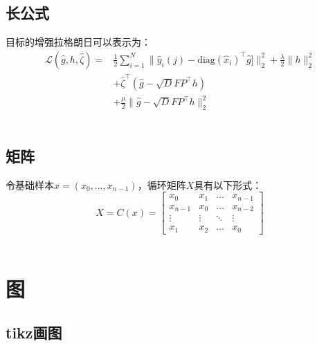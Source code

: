 \subsection{长公式}

目标的增强拉格朗日可以表示为：
~\\
\begin{equation}
    \begin{aligned}
        \mathcal{L}(\hat{g},h,\hat{\zeta})= & \frac{1}{2}\sum_{i=1}^N\|\hat{y}_i(j)-\mathrm{diag}(\hat{x}_i)^\top \hat{g}]\|_2^2 + \frac{\lambda}{2}\|h\|_2^2 \\
                                            & + \hat{\zeta}^\top(\hat{g}-\sqrt{D}FP^\top h)                                                                   \\
                                            & + \frac{\mu}{2}\|\hat{g}-\sqrt{D}FP^\top h\|_2^2
    \end{aligned}
    \label{eq:CFwLB_augmented LagrangianObjectiveFunction}
\end{equation}
~\\

\subsection{矩阵}

令基础样本$x = (x_0,\dots,x_{n-1})$，循环矩阵$X$具有以下形式：
~\\
\begin{equation}
    X = C(x)= \begin{bmatrix}
        x_0     & x_1    & \dots  & x_{n-1} \\
        x_{n-1} & x_0    & \dots  & x_{n-2} \\
        \vdots  & \vdots & \ddots & \vdots  \\
        x_1     & x_2    & \dots  & x_0
    \end{bmatrix}
    \label{eq:RT_circulantMatrix}
\end{equation}
~\\

\section{图}

\subsection{tikz画图}


